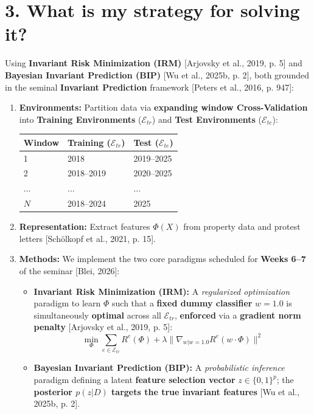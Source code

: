\documentclass[11pt]{article}
\begin{document}
\section*{3. What is my strategy for solving it?}
Using \textbf{Invariant Risk Minimization (IRM)} [Arjovsky et al., 2019, p. 5] and \textbf{Bayesian Invariant Prediction (BIP)} [Wu et al., 2025b, p. 2], both grounded in the seminal \textbf{Invariant Prediction} framework [Peters et al., 2016, p. 947]:
\begin{enumerate}
    \setlength\itemsep{-0.3em}
    \item \textbf{Environments:} Partition data via \textbf{expanding window Cross-Validation} into \textbf{Training Environments} ($\mathcal{E}_{tr}$) and \textbf{Test Environments} ($\mathcal{E}_{te}$):
    \begin{center}
    \scriptsize
    \begin{tabular}{l|l|l}
    \textbf{Window} & \textbf{Training ($\mathcal{E}_{tr}$)} & \textbf{Test ($\mathcal{E}_{te}$)} \\ \hline
    1 & 2018 & 2019--2025 \\
    2 & 2018--2019 & 2020--2025 \\
    ... & ... & ... \\
    $N$ & 2018--2024 & 2025
    \end{tabular}
    \end{center}
    \item \textbf{Representation:} Extract features $\Phi(X)$ from property data and protest letters [Schölkopf et al., 2021, p. 15].
    \item \textbf{Methods:} We implement the two core paradigms scheduled for \textbf{Weeks 6--7} of the seminar [Blei, 2026]:
    \begin{itemize}
        \item \textbf{Invariant Risk Minimization (IRM):} A \textit{regularized optimization} paradigm to learn $\Phi$ such that a \textbf{fixed dummy classifier} $w=1.0$ is simultaneously \textbf{optimal} across all $\mathcal{E}_{tr}$, \textbf{enforced} via a \textbf{gradient norm penalty} [Arjovsky et al., 2019, p. 5]:
        \[ \min_{\Phi} \sum_{e \in \mathcal{E}_{tr}} R^e(\Phi) + \lambda \|\nabla_{w|w=1.0} R^e(w \cdot \Phi)\|^2 \]
        \item \textbf{Bayesian Invariant Prediction (BIP):} A \textit{probabilistic inference} paradigm defining a latent \textbf{feature selection vector} $z \in \{0,1\}^p$; the \textbf{posterior $p(z|D)$ targets the true invariant features} [Wu et al., 2025b, p. 2].
    \end{itemize}
\end{enumerate}
\end{document}
